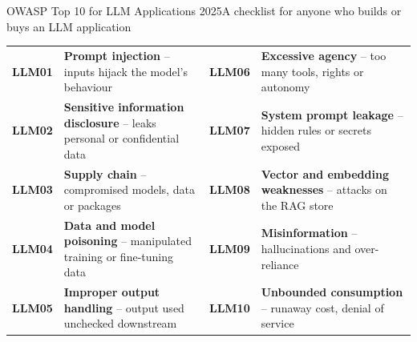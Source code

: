 \documentclass[aspectratio=169,11pt]{beamer}
\gdef\aidasourcetext{}%
\gdef\aidasourcetext{}
\newcommand{\source}[1]{\gdef\aidasourcetext{Source: #1}}
\begin{document}
\begin{frame}{OWASP Top 10 for LLM Applications 2025}{A checklist for anyone who builds or buys an LLM application}
  \footnotesize
  \renewcommand{\arraystretch}{1.6}
  \begin{tabularx}{\linewidth}{@{}l Y @{\hspace{12pt}} l Y@{}}
    \toprule
    \textbf{LLM01} & \textbf{Prompt injection} -- inputs hijack the model's behaviour & \textbf{LLM06} & \textbf{Excessive agency} -- too many tools, rights or autonomy\\
    \textbf{LLM02} & \textbf{Sensitive information disclosure} -- leaks personal or confidential data & \textbf{LLM07} & \textbf{System prompt leakage} -- hidden rules or secrets exposed\\
    \textbf{LLM03} & \textbf{Supply chain} -- compromised models, data or packages & \textbf{LLM08} & \textbf{Vector and embedding weaknesses} -- attacks on the RAG store\\
    \textbf{LLM04} & \textbf{Data and model poisoning} -- manipulated training or fine-tuning data & \textbf{LLM09} & \textbf{Misinformation} -- hallucinations and over-reliance\\
    \textbf{LLM05} & \textbf{Improper output handling} -- output used unchecked downstream & \textbf{LLM10} & \textbf{Unbounded consumption} -- runaway cost, denial of service\\
    \bottomrule
  \end{tabularx}
  \source{OWASP (2024)}
\end{frame}
\end{document}
